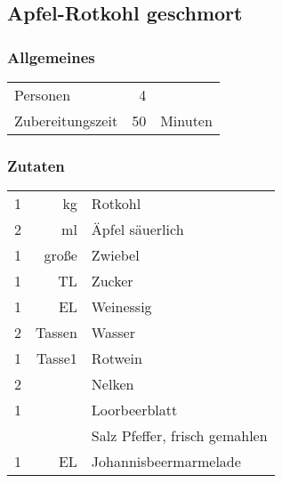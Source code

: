 \subsection{Apfel-Rotkohl geschmort} 

\subsubsection*{Allgemeines}
\begin{tabular}{lrl}
    Personen         &   4 &  \\
    Zubereitungszeit &   50 & Minuten \\
\end{tabular} 

\subsubsection*{Zutaten}
\begin{tabular}{lrl}
    1 &     kg & Rotkohl                       \\
    2 &     ml & Äpfel säuerlich               \\
    1 &  große & Zwiebel                       \\
    1 &     TL & Zucker                        \\
    1 &     EL & Weinessig                     \\
    2 & Tassen & Wasser                        \\
    1 & Tasse1 & Rotwein                       \\
    2 &        & Nelken                        \\
    1 &        & Loorbeerblatt                 \\
    &        & Salz Pfeffer, frisch gemahlen \\
    1 &     EL & Johannisbeermarmelade
\end{tabular} 

